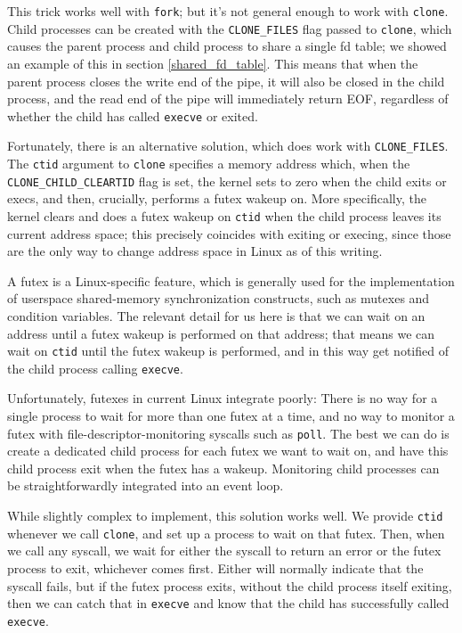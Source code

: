 \documentclass[sigplan]{acmart}
\begin{document}
This trick works well with \texttt{fork};
but it's not general enough to work with \texttt{clone}.
Child processes can be created with the \verb|CLONE_FILES| flag passed to \texttt{clone},
which causes the parent process and child process to share a single fd table;
we showed an example of this in section \ref{shared_fd_table}.
This means that when the parent process closes the write end of the pipe,
it will also be closed in the child process,
and the read end of the pipe will immediately return EOF,
regardless of whether the child has called \texttt{execve} or exited.

Fortunately, there is an alternative solution, which does work with \verb|CLONE_FILES|.
The \texttt{ctid} argument to \texttt{clone} specifies a memory address which,
when the \verb|CLONE_CHILD_CLEARTID| flag is set,
the kernel sets to zero when the child exits or execs,
and then, crucially, performs a futex wakeup on.
More specifically,
the kernel clears and does a futex wakeup on \texttt{ctid} when the child process leaves its current address space;
this precisely coincides with exiting or execing,
since those are the only way to change address space in Linux as of this writing.

A futex is a Linux-specific feature,
which is generally used for the implementation of userspace shared-memory synchronization constructs,
such as mutexes and condition variables.
The relevant detail for us here is that we can wait on an address
until a futex wakeup is performed on that address;
that means we can wait on \texttt{ctid} until the futex wakeup is performed,
and in this way get notified of the child process calling \texttt{execve}.

Unfortunately, futexes in current Linux integrate poorly:
There is no way for a single process to wait for more than one futex at a time,
and no way to monitor a futex with file-descriptor-monitoring syscalls such as \texttt{poll}.
The best we can do is create a dedicated child process for each futex we want to wait on,
and have this child process exit when the futex has a wakeup.
Monitoring child processes can be straightforwardly integrated into an event loop.

While slightly complex to implement, this solution works well.
We provide \texttt{ctid} whenever we call \texttt{clone},
and set up a process to wait on that futex.
Then, when we call any syscall,
we wait for either the syscall to return an error or the futex process to exit,
whichever comes first.
Either will normally indicate that the syscall fails,
but if the futex process exits,
without the child process itself exiting,
then we can catch that in \texttt{execve} and know that the child has successfully called \texttt{execve}.
\end{document}
